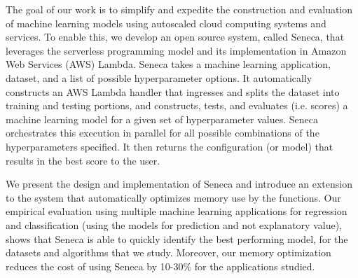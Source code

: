 The goal of our work is to simplify and expedite the 
construction and evaluation of machine learning models 
using autoscaled cloud computing systems and services.
To enable this, we develop an open source system, called Seneca, that leverages
the serverless programming model and its implementation in Amazon Web Services
(AWS) Lambda.  
Seneca takes a machine learning application, dataset, and a list of 
possible hyperparameter options.  It automatically constructs an AWS Lambda
handler that ingresses and splits the dataset into training
and testing portions, and constructs, tests, and evaluates (i.e. scores) a machine
learning model for a given set of hyperparameter values.  Seneca orchestrates
this execution in parallel for all possible combinations of the hyperparameters specified.
It then returns the configuration (or model) that results in the best score 
to the user.  

We present the design and implementation of Seneca and introduce an extension to the
system that automatically optimizes memory use by the functions.  
Our empirical evaluation using
multiple machine learning applications for regression and classification (using
the models for prediction and not explanatory value), shows that Seneca is able to quickly
identify the best performing model,
for the datasets and algorithms that we study. 
Moreover, our memory optimization reduces the cost of using
Seneca by 10-30\% for the applications studied.

